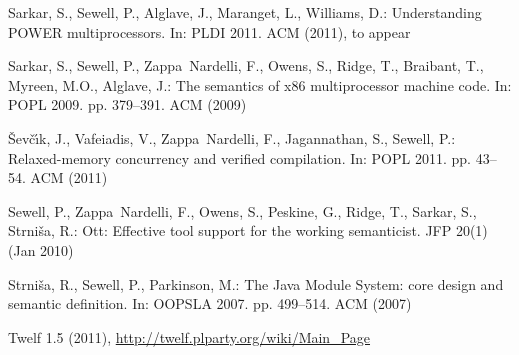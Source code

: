 \documentclass[a4paper]{llncs}
\newcommand{\Sevcik}{\v{S}ev\v{c}\'{\i}k}
\begin{document}
\begin{thebibliography}{10}
Sarkar, S., Sewell, P., Alglave, J., Maranget, L., Williams, D.: Understanding
  {POWER} multiprocessors. In: PLDI 2011. ACM (2011), to appear

Sarkar, S., Sewell, P., Zappa~Nardelli, F., Owens, S., Ridge, T., Braibant, T.,
  Myreen, M.O., Alglave, J.: The semantics of x86 multiprocessor machine code.
  In: POPL 2009. pp. 379--391. ACM (2009)

\Sevcik, J., Vafeiadis, V., Zappa~Nardelli, F., Jagannathan, S., Sewell, P.:
  Relaxed-memory concurrency and verified compilation. In: POPL 2011. pp.
  43--54. ACM (2011)

Sewell, P., Zappa~Nardelli, F., Owens, S., Peskine, G., Ridge, T., Sarkar, S.,
  {Strni\v sa}, R.: Ott: Effective tool support for the working semanticist.
  JFP  20(1) (Jan 2010)

{Strni\v sa}, R., Sewell, P., Parkinson, M.: The {J}ava {M}odule {S}ystem: core
  design and semantic definition. In: OOPSLA 2007. pp. 499--514. ACM (2007)

{Twelf} 1.5 (2011), \url{http://twelf.plparty.org/wiki/Main_Page}

\end{thebibliography}
\end{document}
